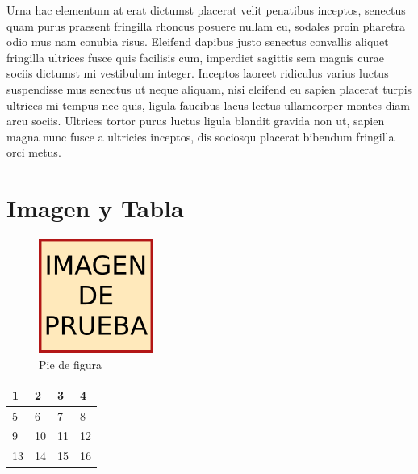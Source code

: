 \documentclass[a4paper,12pt]{article}
\begin{document}
Urna hac elementum at erat dictumst placerat velit penatibus inceptos, senectus quam purus praesent fringilla rhoncus posuere nullam eu, sodales proin pharetra odio mus nam conubia risus. Eleifend dapibus justo senectus convallis aliquet fringilla ultrices fusce quis facilisis cum, imperdiet sagittis sem magnis curae sociis dictumst mi vestibulum integer. Inceptos laoreet ridiculus varius luctus suspendisse mus senectus ut neque aliquam, nisi eleifend eu sapien placerat turpis ultrices mi tempus nec quis, ligula faucibus lacus lectus ullamcorper montes diam arcu sociis. Ultrices tortor purus luctus ligula blandit gravida non ut, sapien magna nunc fusce a ultricies inceptos, dis sociosqu placerat bibendum fringilla orci metus.

\section{Imagen y Tabla}
\begin{figure}[H]
\includegraphics{prueba.png}
\caption{Pie de figura}
\end{figure}

\begin{center}
    \begin{tabular}{ | l | l | l | l |}
    \hline
    1 & 2 & 3 & 4 \\ \hline
    5 & 6 & 7 & 8 \\ \hline
    9 & 10 & 11 & 12 \\ \hline
    13 & 14 & 15 & 16 \\\hline
    \end{tabular}
\end{center}
\end{document}
